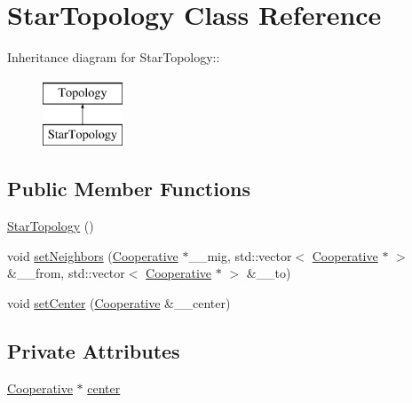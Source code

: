 \hypertarget{classStarTopology}{
\section{Star\-Topology Class Reference}
\label{classStarTopology}
}
Inheritance diagram for Star\-Topology::\begin{figure}[H]
\begin{center}
\leavevmode
\includegraphics[height=2cm]{classStarTopology}
\end{center}
\end{figure}
\subsection*{Public Member Functions}
\begin{CompactItemize}
\item 
\hypertarget{classStarTopology_76868b70acc93be7c53a57678674b833}{
\hyperlink{classStarTopology_76868b70acc93be7c53a57678674b833}{Star\-Topology} ()}
\label{classStarTopology_76868b70acc93be7c53a57678674b833}

\item 
\hypertarget{classStarTopology_e9e129ce442849474d660add8fd96993}{
void \hyperlink{classStarTopology_e9e129ce442849474d660add8fd96993}{set\-Neighbors} (\hyperlink{classCooperative}{Cooperative} $\ast$\_\-\_\-mig, std::vector$<$ \hyperlink{classCooperative}{Cooperative} $\ast$ $>$ \&\_\-\_\-from, std::vector$<$ \hyperlink{classCooperative}{Cooperative} $\ast$ $>$ \&\_\-\_\-to)}
\label{classStarTopology_e9e129ce442849474d660add8fd96993}

\item 
\hypertarget{classStarTopology_a7d8dfebd83b70cd1962b475fd0f5d8d}{
void \hyperlink{classStarTopology_a7d8dfebd83b70cd1962b475fd0f5d8d}{set\-Center} (\hyperlink{classCooperative}{Cooperative} \&\_\-\_\-center)}
\label{classStarTopology_a7d8dfebd83b70cd1962b475fd0f5d8d}

\end{CompactItemize}
\subsection*{Private Attributes}
\begin{CompactItemize}
\item 
\hypertarget{classStarTopology_5cc9978f2a1307ad0164ba129297d305}{
\hyperlink{classCooperative}{Cooperative} $\ast$ \hyperlink{classStarTopology_5cc9978f2a1307ad0164ba129297d305}{center}}
\label{classStarTopology_5cc9978f2a1307ad0164ba129297d305}

\end{CompactItemize}


